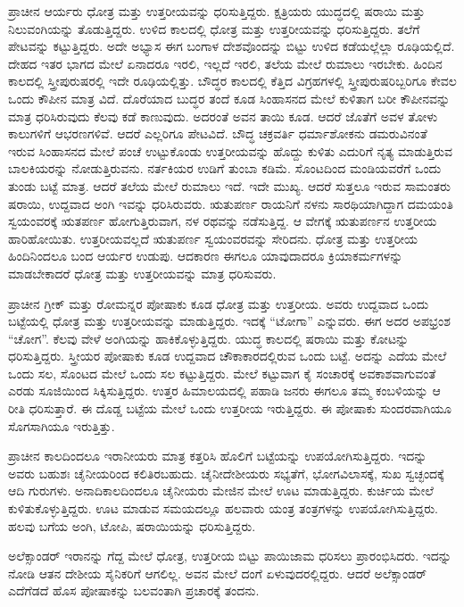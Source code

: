 ಪ್ರಾಚೀನ ಆರ್ಯರು ಧೋತ್ರ ಮತ್ತು ಉತ್ತರೀಯವನ್ನು ಧರಿಸುತ್ತಿದ್ದರು. ಕ್ಷತ್ರಿಯರು ಯುದ್ಧದಲ್ಲಿ ಷರಾಯಿ ಮತ್ತು ನಿಲುವಂಗಿಯನ್ನು ತೊಡುತ್ತಿದ್ದರು. ಉಳಿದ ಕಾಲದಲ್ಲಿ ಧೋತ್ರ ಮತ್ತು ಉತ್ತರೀಯವನ್ನು ಧರಿಸುತ್ತಿದ್ದರು. ತಲೆಗೆ ಪೇಟವನ್ನು ಕಟ್ಟುತ್ತಿದ್ದರು. ಅದೇ ಅಭ್ಯಾಸ ಈಗ ಬಂಗಾಳ ದೇಶವೊಂದನ್ನು ಬಿಟ್ಟು ಉಳಿದ ಕಡೆಯಲ್ಲೆಲ್ಲಾ ರೂಢಿಯಲ್ಲಿದೆ. ದೇಹದ ಇತರ ಭಾಗದ ಮೇಲೆ ಏನಾದರೂ ಇರಲಿ, ಇಲ್ಲದೆ ಇರಲಿ, ತಲೆಯ ಮೇಲೆ ರುಮಾಲು ಇರಬೇಕು. ಹಿಂದಿನ ಕಾಲದಲ್ಲಿ ಸ್ತ್ರೀಪುರುಷರಲ್ಲಿ ಇದೇ ರೂಢಿಯಲ್ಲಿತ್ತು. ಬೌದ್ಧರ ಕಾಲದಲ್ಲಿ ಕೆತ್ತಿದ ವಿಗ್ರಹಗಳಲ್ಲಿ ಸ್ತ್ರೀಪುರುಷರಿಬ್ಬರಿಗೂ ಕೇವಲ ಒಂದು ಕೌಪೀನ ಮಾತ್ರ ವಿದೆ. ದೊರೆಯಾದ ಬುದ್ಧರ ತಂದೆ ಕೂಡ ಸಿಂಹಾಸನದ ಮೇಲೆ ಕುಳಿತಾಗ ಬರೀ ಕೌಪೀನವನ್ನು ಮಾತ್ರ ಧರಿಸಿರುವುದು ಕೆಲವು ಕಡೆ ಕಾಣುವುದು. ಅದರಂತೆ ಅವನ ತಾಯಿ ಕೂಡ. ಆದರೆ ಜೊತೆಗೆ ಅವಳ ತೋಳು ಕಾಲುಗಳಿಗೆ ಆಭರಣಗಳಿವೆ. ಆದರೆ ಎಲ್ಲರಿಗೂ ಪೇಟವಿದೆ. ಬೌದ್ಧ ಚಕ್ರವರ್ತಿ ಧರ್ಮಾಶೋಕನು ಡಮರುವಿನಂತೆ ಇರುವ ಸಿಂಹಾಸನದ ಮೇಲೆ ಪಂಚೆ ಉಟ್ಟುಕೊಂಡು ಉತ್ತರೀಯವನ್ನು ಹೊದ್ದು ಕುಳಿತು ಎದುರಿಗೆ ನೃತ್ಯ ಮಾಡುತ್ತಿರುವ ಬಾಲಕಿಯರನ್ನು ನೋಡುತ್ತಿರುವನು. ನರ್ತಕಿಯರ ಉಡಿಗೆ ತುಂಬಾ ಕಡಿಮೆ. ಸೊಂಟದಿಂದ ಮಂಡಿಯವರೆಗೆ ಒಂದು ತುಂಡು ಬಟ್ಟೆ ಮಾತ್ರ. ಆದರೆ ತಲೆಯ ಮೇಲೆ ರುಮಾಲು ಇದೆ. ಇದೇ ಮುಖ್ಯ. ಆದರೆ ಸುತ್ತಲೂ ಇರುವ ಸಾಮಂತರು ಷರಾಯಿ, ಉದ್ದವಾದ ಅಂಗಿ ಇವನ್ನು ಧರಿಸಿರುವರು. ಋತುಪರ್ಣ ರಾಯನಿಗೆ ನಳನು ಸಾರಥಿಯಾಗಿದ್ದಾಗ ದಮಯಂತಿ ಸ್ವಯಂವರಕ್ಕೆ ಋತಪರ್ಣ ಹೋಗುತ್ತಿರುವಾಗ, ನಳ ರಥವನ್ನು ನಡೆಸುತ್ತಿದ್ದ. ಆ ವೇಗಕ್ಕೆ ಋತುಪರ್ಣನ ಉತ್ತರೀಯ ಹಾರಿಹೋಯಿತು. ಉತ್ತರೀಯವಲ್ಲದೆ ಋತುಪರ್ಣ ಸ್ವಯಂವರವನ್ನು ಸೇರಿದನು. ಧೋತ್ರ ಮತ್ತು ಉತ್ತರೀಯ ಹಿಂದಿನಿಂದಲೂ ಬಂದ ಆರ್ಯರ ಉಡುಪು. ಆದಕಾರಣ ಈಗಲೂ ಯಾವುದಾದರೂ ಕ್ರಿಯಾಕರ್ಮಗಳನ್ನು ಮಾಡಬೇಕಾದರೆ ಧೋತ್ರ ಮತ್ತು ಉತ್ತರೀಯವನ್ನು ಮಾತ್ರ ಧರಿಸುವರು.

ಪ್ರಾಚೀನ ಗ್ರೀಕ್​ ಮತ್ತು ರೋಮನ್ನರ ಪೋಷಾಕು ಕೂಡ ಧೋತ್ರ ಮತ್ತು ಉತ್ತರೀಯ. ಅವರು ಉದ್ದವಾದ ಒಂದು ಬಟ್ಟೆಯಲ್ಲಿ ಧೋತ್ರ ಮತ್ತು ಉತ್ತರೀಯವನ್ನು ಮಾಡುತ್ತಿದ್ದರು. ಇದಕ್ಕೆ “ಟೋಗಾ” ಎನ್ನುವರು. ಈಗ ಅದರ ಅಪಭ್ರಂಶ “ಚೋಗ”. ಕೆಲವು ವೇಳೆ ಅಂಗಿಯನ್ನು ಹಾಕಿಕೊಳ್ಳುತ್ತಿದ್ದರು. ಯುದ್ಧ ಕಾಲದಲ್ಲಿ ಷರಾಯಿ ಮತ್ತು ಕೋಟನ್ನು ಧರಿಸುತ್ತಿದ್ದರು. ಸ್ತ್ರೀಯರ ಪೋಷಾಕು ಕೂಡ ಉದ್ದವಾದ ಚೌಕಾಕಾರದಲ್ಲಿರುವ ಒಂದು ಬಟ್ಟೆ. ಅದನ್ನು ಎದೆಯ ಮೇಲೆ ಒಂದು ಸಲ, ಸೊಂಟದ ಮೇಲೆ ಒಂದು ಸಲ ಕಟ್ಟುತ್ತಿದ್ದರು. ಮೇಲೆ ಕಟ್ಟುವಾಗ ಕೈ ಸಂಚಾರಕ್ಕೆ ಅವಕಾಶವಾಗುವಂತೆ ಎರಡು ಸೂಜಿಯಿಂದ ಸಿಕ್ಕಿಸುತ್ತಿದ್ದರು. ಉತ್ತರ ಹಿಮಾಲಯದಲ್ಲಿ ಪಹಾಡಿ ಜನರು ಈಗಲೂ ತಮ್ಮ ಕಂಬಳಿಯನ್ನು ಆ ರೀತಿ ಧರಿಸುತ್ತಾರೆ. ಈ ದೊಡ್ಡ ಬಟ್ಟೆಯ ಮೇಲೆ ಒಂದು ಉತ್ತರೀಯ ಇರುತ್ತಿದ್ದರು. ಈ ಪೋಷಾಕು ಸುಂದರವಾಗಿಯೂ ಸೊಗಸಾಗಿಯೂ ಇರುತ್ತಿತ್ತು.

ಪ್ರಾಚೀನ ಕಾಲದಿಂದಲೂ ಇರಾನೀಯರು ಮಾತ್ರ ಕತ್ತರಿಸಿ ಹೊಲಿಗೆ ಬಟ್ಟೆಯನ್ನು ಉಪಯೋಗಿಸುತ್ತಿದ್ದರು. ಇದನ್ನು ಅವರು ಬಹುಶಃ ಚೈನೀಯರಿಂದ ಕಲಿತಿರಬಹುದು. ಚೈನೀದೇಶೀಯರು ಸಭ್ಯತೆಗೆ, ಭೋಗವಿಲಾಸಕ್ಕೆ, ಸುಖ ಸ್ವಚ್ಛಂದಕ್ಕೆ ಆದಿ ಗುರುಗಳು. ಅನಾದಿಕಾಲದಿಂದಲೂ ಚೈನೀಯರು ಮೇಜಿನ ಮೇಲೆ ಊಟ ಮಾಡುತ್ತಿದ್ದರು. ಕುರ್ಚಿಯ ಮೇಲೆ ಕುಳಿತುಕೊಳ್ಳುತ್ತಿದ್ದರು. ಊಟ ಮಾಡುವ ಸಮಯದಲ್ಲೂ ಹಲವಾರು ಯಂತ್ರ ತಂತ್ರಗಳನ್ನು ಉಪಯೋಗಿಸುತ್ತಿದ್ದರು. ಹಲವು ಬಗೆಯ ಅಂಗಿ, ಟೋಪಿ, ಷರಾಯಿಯನ್ನು ಧರಿಸುತ್ತಿದ್ದರು.

ಅಲೆಕ್ಸಾಂಡರ್​ ಇರಾನನ್ನು ಗೆದ್ದ ಮೇಲೆ ಧೋತ್ರ, ಉತ್ತರೀಯ ಬಿಟ್ಟು ಪಾಯಿಜಾಮ ಧರಿಸಲು ಪ್ರಾರಂಭಿಸಿದರು. ಇದನ್ನು ನೋಡಿ ಆತನ ದೇಶೀಯ ಸೈನಿಕರಿಗೆ ಆಗಲಿಲ್ಲ. ಅವನ ಮೇಲೆ ದಂಗೆ ಏಳುವುದರಲ್ಲಿದ್ದರು. ಆದರೆ ಅಲೆಕ್ಸಾಂಡರ್​ ಎದೆಗೆಡದೆ ಹೊಸ ಪೋಷಾಕನ್ನು ಬಲವಂತಾಗಿ ಪ್ರಚಾರಕ್ಕೆ ತಂದನು.

